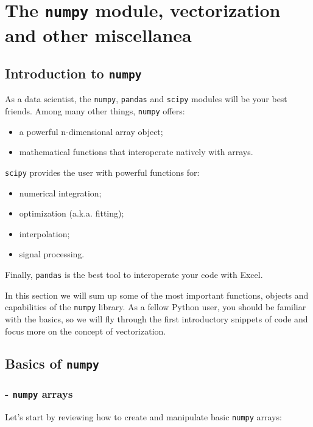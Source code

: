 \section{The \texttt{numpy} module, vectorization and other miscellanea}

\subsection{Introduction to \texttt{numpy}}
As a data scientist, the \texttt{numpy}, \texttt{pandas} and \texttt{scipy} modules will be your best friends.
Among many other things, \texttt{numpy} offers:
\begin{itemize}
    \item[-] a powerful n-dimensional array object;
    \item[-] mathematical functions that interoperate natively with arrays.
\end{itemize}
\texttt{scipy} provides the user with powerful functions for:
\begin{itemize}
    \item[-] numerical integration;
    \item[-] optimization (a.k.a. fitting);
    \item[-] interpolation;
    \item[-] signal processing.
\end{itemize}
Finally, \texttt{pandas} is the best tool to interoperate your code with Excel.

In this section we will sum up some of the most important functions, objects and capabilities of the \texttt{numpy} library. As a fellow Python user, you should be familiar with the basics, so we will fly through the first introductory snippets of code and focus more on the concept of vectorization.

\subsection{Basics of \texttt{numpy}}
\subsubsection{- \texttt{numpy} arrays}
Let's start by reviewing how to create and manipulate basic \texttt{numpy} arrays:



